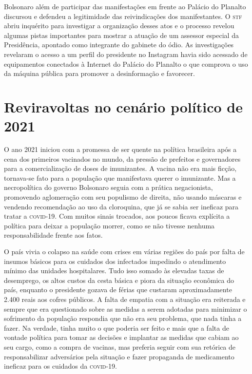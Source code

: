 Bolsonaro além de participar das manifestações em frente ao Palácio do
Planalto discursou e defendeu a legitimidade das reivindicações dos
manifestantes. O \textsc{stf} abriu inquérito para investigar a organização
desses atos e o processo revelou algumas pistas importantes para mostrar
a atuação de um assessor especial da Presidência, apontado como
integrante do gabinete do ódio. As investigações revelaram o acesso a um
perfil do presidente no Instagram havia sido acessado de equipamentos
conectados à Internet do Palácio do Planalto o que comprova o uso da
máquina pública para promover a desinformação e favorecer.

\section{Reviravoltas no cenário político de 2021}

O ano 2021 iniciou com a promessa de ser quente na política brasileira
após a cena dos primeiros vacinados no mundo, da pressão de prefeitos e
governadores para a comercialização de doses de imunizantes. A vacina
não era mais ficção, tornava-se fato para a população que manifestava
querer o imunizante. Mas a necropolítica do governo Bolsonaro seguia com
a prática negacionista, promovendo aglomeração com seu populismo de
direita, não usando máscaras e vendendo recomendação ao uso da
cloroquina, que já se sabia ser ineficaz para tratar a \textsc{covid-19}. Com
muitos sinais trocados, aos poucos ficava explícita a política para
deixar a população morrer, como se não tivesse nenhuma responsabilidade
frente aos fatos.

O país vivia o colapso na saúde com crises em várias regiões do país por
falta de insumos básicos para os cuidados dos infectados impedindo o
atendimento mínimo das unidades hospitalares. Tudo isso somado às
elevadas taxas de desemprego, os altos custos da cesta básica e piora da
situação econômica do país, enquanto o presidente gozava de férias que
custaram aproximadamente 2.400 reais aos cofres públicos. A falta de
empatia com a situação era reiterada e sempre que era questionado sobre
as medidas a serem adotadas para minimizar o sofrimento da população
respondia que não era seu problema, que nada tinha a fazer. Na verdade,
tinha muito o que poderia ser feito e mais que a falta de vontade
política para tomar as decisões e implantar as medidas que cabiam ao seu
cargo, como a compra de vacinas, mas preferia seguir com sua retórica de
responsabilizar adversários pela situação e fazer propaganda de
medicamento ineficaz para os cuidados da \textsc{covid-19}.

